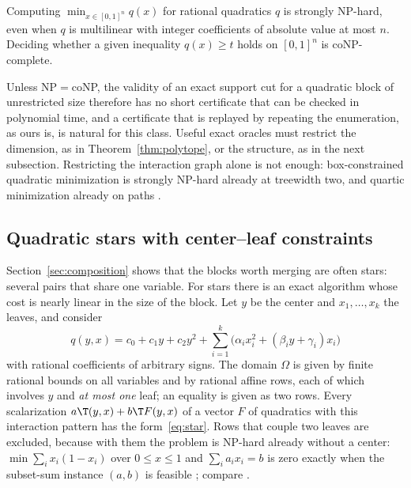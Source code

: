 \begin{proposition}\label{prop:maxcut}
Computing $\min_{x\in[0,1]^n}q(x)$ for rational quadratics $q$ is strongly
NP-hard, even when $q$ is multilinear with integer coefficients of absolute
value at most $n$. Deciding whether a given inequality $q(x)\ge t$ holds on
$[0,1]^n$ is coNP-complete.
\end{proposition}

Unless NP${}={}$coNP, the validity of an exact support cut for a quadratic
block of unrestricted size therefore has no short certificate that can be
checked in polynomial time, and a certificate that is replayed by repeating
the enumeration, as ours is, is natural for this class. Useful exact oracles
must restrict the dimension, as in Theorem~\ref{thm:polytope}, or the
structure, as in the next subsection. Restricting the interaction graph alone
is not enough: box-constrained quadratic minimization is strongly NP-hard
already at treewidth two, and quartic minimization already on paths
\citep[Theorems~2 and~3]{DelPiaKhajavirad2026}.

\subsection{Quadratic stars with center--leaf constraints}\label{sec:star}

Section~\ref{sec:composition} shows that the blocks worth merging are often
stars: several pairs that share one variable. For stars there is an exact
algorithm whose cost is nearly linear in the size of the block. Let $y$ be
the center and $x_1,\dots,x_k$ the leaves, and consider
\begin{equation}\label{eq:star}
q(y,x)=c_0+c_1y+c_2y^2+\sum_{i=1}^k\bigl(\alpha_ix_i^2+(\beta_iy+\gamma_i)x_i\bigr)
\end{equation}
with rational coefficients of arbitrary signs. The domain $\Omega$ is given by
finite rational bounds on all variables and by rational affine rows, each of
which involves $y$ and \emph{at most one} leaf; an equality is given as two
rows. Every scalarization $a\T(y,x)+b\T F(y,x)$ of a vector $F$ of quadratics
with this interaction pattern has the form~\eqref{eq:star}. Rows that couple
two leaves are excluded, because with them the problem is NP-hard already
without a center: $\min\sum_ix_i(1-x_i)$ over $0\le x\le1$ and
$\sum_ia_ix_i=b$ is zero exactly when the subset-sum instance $(a,b)$ is
feasible \citep{Karp1972}; compare \citet{MoreVavasis1990}.

